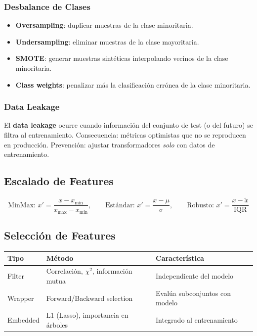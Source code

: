 \documentclass[12pt, a4paper]{article}
\begin{document}
\subsubsection{Desbalance de Clases}
\begin{itemize}
	\item \textbf{Oversampling}: duplicar muestras de la clase minoritaria.
	\item \textbf{Undersampling}: eliminar muestras de la clase mayoritaria.
	\item \textbf{SMOTE}: generar muestras sintéticas interpolando vecinos de la clase minoritaria.
	\item \textbf{Class weights}: penalizar más la clasificación errónea de la clase minoritaria.
\end{itemize}

\subsubsection{Data Leakage}
\begin{notebox}
	El \textbf{data leakage} ocurre cuando información del conjunto de test (o del futuro)
	se filtra al entrenamiento. Consecuencia: métricas optimistas que no se reproducen en
	producción. Prevención: ajustar transformadores \emph{solo} con datos de entrenamiento.
\end{notebox}

\subsection{Escalado de Features}
\[
	\text{MinMax: } x' = \frac{x - x_{\min}}{x_{\max} - x_{\min}}, \qquad
	\text{Estándar: } x' = \frac{x - \mu}{\sigma}, \qquad
	\text{Robusto: } x' = \frac{x - \tilde{x}}{\text{IQR}}
\]

\subsection{Selección de Features}
\begin{center}
	\begin{tabular}{lll}
		\toprule
		\textbf{Tipo} & \textbf{Método}                          & \textbf{Característica}        \\
		\midrule
		Filter        & Correlación, $\chi^2$, información mutua & Independiente del modelo       \\
		Wrapper       & Forward/Backward selection               & Evalúa subconjuntos con modelo \\
		Embedded      & L1 (Lasso), importancia en árboles       & Integrado al entrenamiento     \\
		\bottomrule
	\end{tabular}
\end{center}
\end{document}
